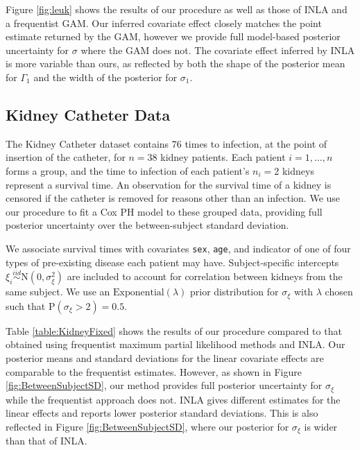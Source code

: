 \documentclass[num-refs,serif,10pt]{wiley-article}
\begin{document}
Figure \ref{fig:leuk} shows the results of our procedure as well as those of INLA and a frequentist GAM. Our inferred covariate effect closely matches the point estimate returned by the GAM, however we provide full model-based posterior uncertainty for $\sigma$ where the GAM does not. The covariate effect inferred by INLA is more variable than ours, as reflected by both the shape of the posterior mean for $\Gamma_{1}$ and the width of the posterior for $\sigma_{1}$.

\subsection{Kidney Catheter Data}\label{subsec:kidney}

The Kidney Catheter dataset contains 76 times to infection, at the point of insertion of the catheter, for $n = 38$  kidney patients. Each patient $i=1,\ldots,n$ forms a group, and the time to infection of each patient's $n_{i} = 2$ kidneys represent a survival time. An observation for the survival time of a kidney is censored if the catheter is removed for reasons other than an infection. We use our procedure to fit a Cox PH model to these grouped data, providing full posterior uncertainty over the between-subject standard deviation.

We associate survival times with covariates \texttt{sex}, \texttt{age}, and indicator of one of four types of pre-existing disease each patient may have. Subject-specific intercepts $\xi_{i}\overset{iid}{\sim}\text{N}(0,\sigma^{2}_{\xi})$ are included to account for correlation between kidneys from the same subject. We use an $\text{Exponential}(\lambda)$ prior distribution for $\sigma_{\xi}$ with $\lambda$ chosen such that $\text{P}(\sigma_{\xi} > 2) = 0.5$.

Table \ref{table:KidneyFixed} shows the results of our procedure compared to that obtained using frequentist maximum partial likelihood methods and INLA. Our posterior means and standard deviations for the linear covariate effects are comparable to the frequentist estimates. However, as shown in Figure \ref{fig:BetweenSubjectSD}, our method provides full posterior uncertainty for $\sigma_{\xi}$ while the frequentist approach does not. INLA gives different estimates for the linear effects and reports lower posterior standard deviations. This is also reflected in Figure \ref{fig:BetweenSubjectSD}, where our posterior for $\sigma_{\xi}$ is wider than that of INLA.
\end{document}
